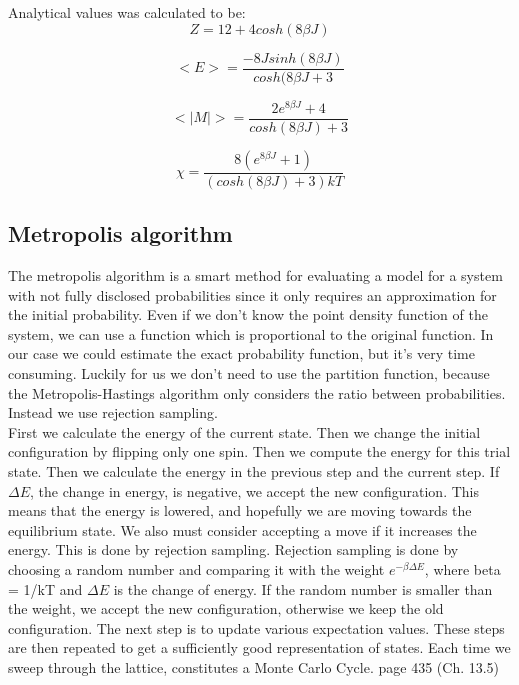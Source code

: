 Analytical values was calculated to be:\\

\begin{equation}
Z = 12+4cosh(8\beta J)
\end{equation}

\begin{equation}
<E> = \frac{-8Jsinh(8\beta J)}{cosh(8\beta J + 3}
\end{equation}

\begin{equation}
<|M|> = \frac{2e^{8\beta J}+4}{cosh(8\beta J)+3}
\end{equation}

\begin{equation}
\chi = \frac{8(e^{8\beta J}+1)}{(cosh(8\beta J)+3)kT}
\end{equation}

\subsection{Metropolis algorithm}
The metropolis algorithm is a smart method for evaluating a model for a system with not fully disclosed probabilities since it only requires an approximation for the initial probability. Even if we don't know the point density function of the system, we can use a function which is proportional to the original function. In our case we could estimate the exact probability function, but it's very time consuming. Luckily for us we don't need to use the partition function, because the Metropolis-Hastings algorithm only considers the ratio between probabilities. Instead we use rejection sampling.\\




First we calculate the energy of the current state. Then we change the initial configuration by flipping only one spin. Then we compute the energy for this trial state. Then we calculate the energy in the previous step and the current step.  If $\Delta E$, the change in energy, is negative, we accept the new configuration. This means that the energy is lowered, and hopefully we are moving towards the equilibrium state. We also must consider accepting a move if it increases the energy. This is done by rejection sampling. Rejection sampling is done by choosing a random number and comparing it with the weight 
$e^{-\beta \Delta E}$, where beta = 1/kT and $\Delta E$ is the change of energy. If the random number is smaller than the weight, we accept the new configuration, otherwise we keep the old configuration. The next step is to update various expectation values. These steps are then repeated to get a sufficiently good representation of states. Each time we sweep through the lattice, constitutes a Monte Carlo Cycle. \cite{lecturenote} page 435 (Ch. 13.5)\\





